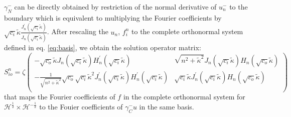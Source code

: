 \documentclass[12pt,journal,compsoc, onecolumn]{IEEEtran}
\begin{document}
$\gamma_N^-$ can be directly obtained by restriction of the normal derivative of $u_n^-$ to the boundary 
which is equivalent to multiplying the Fourier coefficients by $\sqrt{c_i} \tilde \kappa\frac{J_n^\prime(\sqrt{c_i}\tilde \kappa)}{J_n(\sqrt{c_i}\tilde \kappa)}$.
After rescaling the $u_n$, $f_i^n$ to the complete orthonormal system defined in eq. \ref{eq:basis},
we obtain the solution operator matrix: 
\begin{equation}
    S_{io}^n = 
    \zeta
    \begin{pmatrix}
        -\sqrt{c_o}\tilde \kappa J_n(\sqrt{c_i} \tilde \kappa) H_n^\prime(\sqrt{c_i} \tilde \kappa) & 
        \sqrt{n^2 + \tilde \kappa^2} J_n(\sqrt{c_i} \tilde \kappa) H_n(\sqrt{c_o} \tilde \kappa)  \\
        -\frac{1}{\sqrt{n^2 + \tilde \kappa^2}}\sqrt{c_o}\sqrt{c_i} \tilde \kappa^2 J^\prime_n(\sqrt{c_i} \tilde \kappa) H_n^\prime(\sqrt{c_i} \tilde \kappa) & 
        \sqrt{c_i} \tilde \kappa J^\prime_n(\sqrt{c_i} \tilde \kappa) H_n(\sqrt{c_o} \tilde \kappa) \\
    \end{pmatrix}
\end{equation}
\noindent
that maps the Fourier coefficients of $f$ in the complete orthonormal system for $\mathcal{H}^{\frac{1}{2}}\times \mathcal{H}^{-\frac{1}{2}}$
 to the Fouier coefficients of $\gamma_C^-u$ in the same basis.
\end{document}
